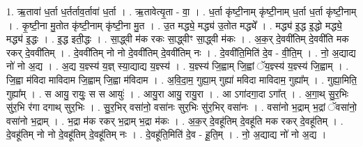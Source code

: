 \documentclass[17pt]{extarticle}
\begin{document}
1. ऋ॒तावा॑ ध॒र्ता ध॒र्तर्ताव॒र्तावा॑ ध॒र्ता । . ऋ॒तावेत्यृ॒ता - वा॒ । . ध॒र्ता कृ॑ष्टी॒नाम् कृ॑ष्टी॒नाम् ध॒र्ता ध॒र्ता कृ॑ष्टी॒नाम् । . कृ॒ष्टी॒ना मु॒तोत कृ॑ष्टी॒नाम् कृ॑ष्टी॒ना मु॒त । . उ॒त मद्ध्ये॒ मद्ध्य॑ उ॒तोत मद्ध्ये᳚ । . मद्ध्य॑ इ॒द्ध इ॒द्धो मद्ध्ये॒ मद्ध्य॑ इ॒द्धः । . इ॒द्ध इती॒द्धः । . सा॒द्ध्वी म॑क रकः सा॒द्ध्वीꣳ सा॒द्ध्वी म॑कः । . अ॒क॒र् दे॒ववी॑तिम् दे॒ववी॑ति मक रकर् दे॒ववी॑तिम् । . दे॒ववी॑तिम् नो नो दे॒ववी॑तिम् दे॒ववी॑तिम् नः । . दे॒ववी॑ति॒मिति॑ दे॒व - वी॒ति॒म् । . नो॒ अ॒द्याद्य नो॑ नो अ॒द्य । . अ॒द्य य॒ज्ञ्स्य॑ य॒ज्ञ् स्या॒द्याद्य य॒ज्ञ्स्य॑ । . य॒ज्ञ्स्य॑ जि॒ह्वाम् जि॒ह्वां ॅय॒ज्ञ्स्य॑ य॒ज्ञ्स्य॑ जि॒ह्वाम् । . जि॒ह्वा म॑विदा माविदाम जि॒ह्वाम् जि॒ह्वा म॑विदाम । . अ॒वि॒दा॒म॒ गुह्या॒म् गुह्या॑ मविदा माविदाम॒ गुह्या᳚म् । . गुह्या॒मिति॒ गुह्या᳚म् । . स आयु॒ रायुः॒ स स आयुः॑ । . आयु॒रा आयु॒ रायु॒रा । . आ ऽगा॑दगा॒दा ऽगा᳚त् । . अ॒गा॒थ् सु॒र॒भिः सु॑र॒भि र॑गा दगाथ् सुर॒भिः । . सु॒र॒भिर् वसा॑नो॒ वसा॑नः सुर॒भिः सु॑र॒भिर् वसा॑नः । . वसा॑नो भ॒द्राम् भ॒द्रां ॅवसा॑नो॒ वसा॑नो भ॒द्राम् । . भ॒द्रा म॑क रकर् भ॒द्राम् भ॒द्रा म॑कः । . अ॒क॒र् दे॒वहू॑तिम् दे॒वहू॑ति मक रकर् दे॒वहू॑तिम् । . दे॒वहू॑तिम् नो नो दे॒वहू॑तिम् दे॒वहू॑तिम् नः । . दे॒वहू॑ति॒मिति॑ दे॒व - हू॒ति॒म् । . नो॒ अ॒द्याद्य नो॑ नो अ॒द्य । \newline
\end{document}
